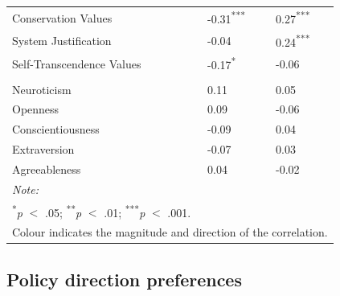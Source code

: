 \documentclass[
  letterpaper,
  DIV=11,
  numbers=noendperiod]{scrartcl}
\begin{document}
\begin{table}
{\begin{tabular}[t]{l>{\raggedright\arraybackslash}p{9em}>{\raggedright\arraybackslash}p{9em}}
\hspace{1em}Conservation Values & \textcolor[HTML]{798234}{-0.31\textsuperscript{***}} & \textcolor[HTML]{D46780}{0.27\textsuperscript{***}}\\
\hspace{1em}System Justification & \textcolor[HTML]{808080}{-0.04} & \textcolor[HTML]{D46780}{0.24\textsuperscript{***}}\\
\hspace{1em}Self-Transcendence Values & \textcolor[HTML]{798234}{-0.17\textsuperscript{*}} & \textcolor[HTML]{808080}{-0.06}\\
\addlinespace[0.3em]
\multicolumn{3}{l}{\textbf{Personality}}\\
\hspace{1em}Neuroticism & \textcolor[HTML]{808080}{0.11} & \textcolor[HTML]{808080}{0.05}\\
\hspace{1em}Openness & \textcolor[HTML]{808080}{0.09} & \textcolor[HTML]{808080}{-0.06}\\
\hspace{1em}Conscientiousness & \textcolor[HTML]{808080}{-0.09} & \textcolor[HTML]{808080}{0.04}\\
\hspace{1em}Extraversion & \textcolor[HTML]{808080}{-0.07} & \textcolor[HTML]{808080}{0.03}\\
\hspace{1em}Agreeableness & \textcolor[HTML]{808080}{0.04} & \textcolor[HTML]{808080}{-0.02}\\
\bottomrule
\multicolumn{3}{l}{\rule{0pt}{1em}\textit{Note: }}\\
\multicolumn{3}{l}{\rule{0pt}{1em}\textsuperscript{*}\textit{p} $<$ .05; \textsuperscript{**}\textit{p} $<$ .01; \textsuperscript{***}\textit{p} $<$ .001.}\\
\multicolumn{3}{l}{\rule{0pt}{1em}\parbox{30em}{Colour indicates the magnitude and direction of the correlation.}}\\
\end{tabular}

}

\end{table}%

\clearpage

\subsection{Policy direction
preferences}\label{policy-direction-preferences}
\end{document}
